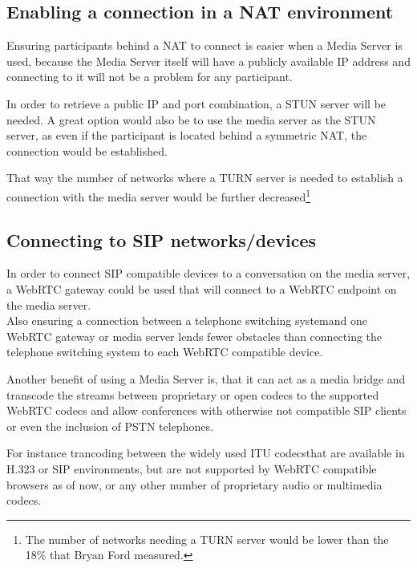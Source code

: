 \documentclass[../../../thesis.tex]{subfiles}
\begin{document}
\subsection{Enabling a connection in a NAT environment}
\label{subsec:stun-and-ms}
Ensuring participants behind a NAT to connect is easier when a Media Server is used, because the Media Server itself will have a publicly available IP address and connecting to it will not be  a problem for any participant.\par
In order to retrieve a public IP and port combination, a STUN server will be needed.
A great option would also be to use the media server as the STUN server, as even if the participant is located behind a symmetric NAT\footnotemark, the connection would be established.\par
That way the number of networks where a TURN server is needed to establish a connection with the media server would be further decreased\footnote{The number of networks needing a TURN server would be lower than the 18\% that Bryan Ford\cite{Bry2005} measured.}\par



\subsection{Connecting to SIP networks/devices}
In order to connect SIP compatible devices to a conversation on the media server, a WebRTC gateway could be used that will connect to a WebRTC endpoint on the media server.\\
Also ensuring a connection between a telephone switching system\footnotemark and one WebRTC gateway or media server lends fewer obstacles than connecting the telephone switching system to each WebRTC compatible device.\par


Another benefit of using a Media Server is, that it can act as a media bridge and transcode the streams between proprietary or open codecs to the supported WebRTC codecs and allow conferences with otherwise not compatible SIP clients or even the inclusion of PSTN telephones.\par
For instance trancoding between the widely used ITU codecs\footnotemark that are available in H.323 or SIP environments\cite{Hersent.2005}, but are not supported by WebRTC compatible browsers as of now, or any other number of proprietary audio or multimedia codecs.

\end{document}
